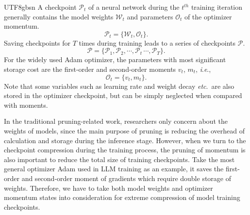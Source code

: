 \documentclass{article}
\theoremstyle{plain}
\theoremstyle{definition}
\theoremstyle{remark}
\newcommand{\ie}{\textit{i}.\textit{e}.}
\newcommand{\etc}{\textit{etc}.}
\begin{document}
\begin{CJK}{UTF8}{gbsn}
A checkpoint $\mathcal P_t$ of a neural network during the $t^{th}$ training iteration generally contains the model weights $\mathcal W_t$ and parameters $\mathcal O_t$ of the optimizer momentum.
\begin{equation}\label{eq:ckpt}
	\mathcal P_t = \{\mathcal W_t, \mathcal O_t\}.
\end{equation}
Saving checkpoints for $T$ times during training leads to a series of checkpoints $\mathcal P$.
\begin{equation}\label{eq:ckpt_all}
	\mathcal P = \{\mathcal P_1, \mathcal P_2, \cdots, \mathcal P_t\, \cdots, \mathcal P_T\}.
\end{equation}
For the widely used Adam optimizer, the parameters with most significant storage cost are the first-order and second-order moments $v_t$, $m_t$, \ie, 
\begin{equation}\label{eq:ckpt_adam}
	\mathcal O_t = \{v_t, m_t\}.
\end{equation}
Note that some variables such as learning rate and weight decay \etc\ are also stored in the optimizer checkpoint, but can be simply neglected when compared with moments.

In the traditional pruning-related work, researchers only concern about the weights of models, since the main purpose of pruning is reducing the overhead of calculation and storage during the inference stage. However, when we turn to the checkpoint compression during the training process, the pruning of momentum is also important to reduce the total size of training checkpoints. Take the most general optimizer Adam used in LLM training as an example, it saves the first-order and second-order moment of gradients which require double storage of weights. Therefore, we have to take both model weights and optimizer momentum states into consideration for extreme compression of model training checkpoints.


\end{CJK}
\end{document}
